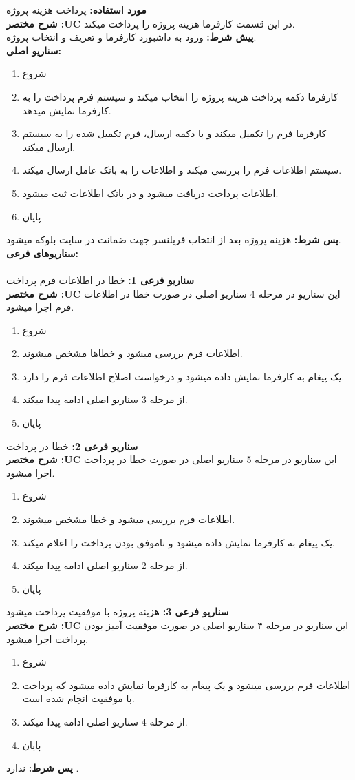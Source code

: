 \documentclass[20pt,a5paper]{report}
\begin{document}
\noindent \textbf{مورد استفاده:}
پرداخت هزینه پروژه
\\
\textbf{شرح مختصر :UC}
در این قسمت کارفرما هزینه پروژه را پرداخت میکند.
\\
\textbf{پيش شرط:}
ورود به داشبورد کارفرما و تعریف و انتخاب پروژه.
\\
\textbf{سناريو اصلی:}
\begin{enumerate}
\item
شروع
\item
کارفرما دکمه پرداخت هزینه پروژه را انتخاب میکند و سیستم فرم پرداخت را به کارفرما نمایش میدهد.
\item
کارفرما فرم را تکمیل میکند و با دکمه ارسال، فرم تکمیل شده را به سیستم ارسال میکند.
\item
سیستم اطلاعات فرم را بررسی میکند و اطلاعات را به بانک عامل ارسال میکند.
\item
اطلاعات پرداخت دریافت میشود و در بانک اطلاعات ثبت میشود.
\item
پایان
\end{enumerate}
\textbf{پس شرط:}
هزینه پروژه بعد از انتخاب فریلنسر جهت ضمانت در سایت بلوکه میشود.
\\
\textbf{سناريوهای فرعی:}
\\ \\
\textbf{سناريو فرعی 1:}
خطا در اطلاعات فرم پرداخت
\\
\textbf{شرح مختصر :UC}
این سناریو در مرحله 4 سناریو اصلی در صورت خطا در اطلاعات فرم اجرا میشود.
\begin{enumerate}
\item
شروع
\item
اطلاعات فرم بررسی میشود و خطاها مشخص میشوند.
\item
یک پیغام به کارفرما نمایش داده میشود و درخواست اصلاح اطلاعات فرم را دارد.
\item
از مرحله 3 سناریو اصلی ادامه پیدا میکند.
\item
پایان
\end{enumerate}
\textbf{سناريو فرعی 2:}
خطا در پرداخت
\\
\textbf{شرح مختصر :UC}
این سناریو در مرحله 5 سناریو اصلی در صورت خطا در پرداخت اجرا میشود.
\begin{enumerate}
\item
شروع
\item
اطلاعات فرم بررسی میشود و خطا مشخص میشوند.
\item
یک پیغام به کارفرما نمایش داده میشود و ناموفق بودن پرداخت را اعلام میکند.
\item
از مرحله 2 سناریو اصلی ادامه پیدا میکند.
\item
پایان
\end{enumerate}
\textbf{سناريو فرعی 3:}
هزینه پروژه با موفقیت پرداخت میشود
\\
\textbf{شرح مختصر :UC}
این سناریو در مرحله ۴ سناریو اصلی در صورت موفقیت آمیز بودن پرداخت اجرا میشود.
\begin{enumerate}
\item
شروع
\item
اطلاعات فرم بررسی میشود و یک پیغام به کارفرما نمایش داده میشود که پرداخت با موفقیت انجام شده است.
\item
از مرحله 4 سناریو اصلی ادامه پیدا میکند.
\item
پایان
\end{enumerate}

\textbf{پس شرط:}
ندارد .


\centering
\vfill
\lr{\LaTeX}
\end{document}
